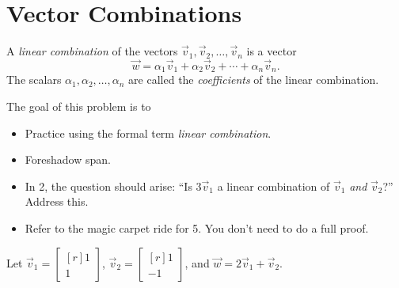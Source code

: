 \documentclass{problemset}
\newcommand{\mat}[1]{\begin{bmatrix*}[r]#1\end{bmatrix*}}
\begin{document}
\section*{Vector Combinations}
	\vspace{-1em}

	\begin{definition}
		A \emph{linear combination} of the vectors $\vec v_1,\vec v_2,\ldots,\vec v_n$ is
		a vector
		\[
			\vec w = \alpha_1\vec v_1+\alpha_2\vec v_2+\cdots+\alpha_n\vec v_n.
		\]
		The scalars $\alpha_1,\alpha_2,\ldots,\alpha_n$ are called the \emph{coefficients} of the linear combination.
	\end{definition}

	\question
	\label{ProbSkewBasis}
	\begin{annotation}
		\begin{goals}

			The goal of this problem is to
			\begin{itemize}
				\item Practice using the formal term \emph{linear combination}.
				\item Foreshadow span.
			\end{itemize}
		\end{goals}

		\begin{notes}
			\begin{itemize}
				\item In 2, the question should arise: ``Is $3\vec v_1$
					a linear combination of $\vec v_1$ \emph{and}
					$\vec v_2$?'' Address this.
				\item Refer to the magic carpet ride for 5. You don't
					need to do a full proof.
			\end{itemize}
		\end{notes}
	\end{annotation}
	Let $\vec v_1=\mat{1\\1}$, $\vec v_2=\mat{1\\-1}$, and $\vec w=2\vec v_1+\vec v_2$.
\end{document}
